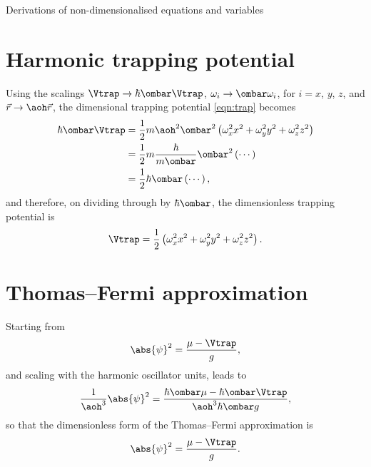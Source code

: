 \begin{chapter}{\label{cha:nondim}Derivations of non-dimensionalised equations
and variables}
  \section{Harmonic trapping potential}
  Using the scalings $\Vtrap \to \hbar \ombar \Vtrap$,  $\omega_{i} \to \ombar
  \omega_{i}$, for $i=x$, $y$, $z$, and $\vec{r} \to \aoh \vec{r}$, the
  dimensional trapping potential \ref{eqn:trap} becomes
  \begin{equation*}
    \begin{aligned}
      \hbar \ombar \Vtrap &= \frac{1}{2} m \aoh^{2} \ombar^{2} \left(
      \omega_{x}^{2} x^{2} + \omega_{y}^{2} y^{2} + \omega_{z}^{2} z^{2}
      \right) \\
      &= \frac{1}{2} m \frac{\hbar}{m \ombar} \ombar^{2} \left( \cdots \right)
      \\
      &= \frac{1}{2} \hbar \ombar \left( \cdots \right),
    \end{aligned}
  \end{equation*}
  and therefore, on dividing through by $\hbar \ombar$, the dimensionless
  trapping potential is
  \begin{equation*}
    \Vtrap = \frac{1}{2} \left( \omega_{x}^{2} x^{2} + \omega_{y}^{2} y^{2} +
    \omega_{z}^{2} z^{2} \right).
  \end{equation*}

  \section{Thomas--Fermi approximation}
  Starting from
  \begin{equation*}
    \abs{\psi}^{2} = \frac{\mu - \Vtrap}{g},
  \end{equation*}
  and scaling with the harmonic oscillator units, leads to
  \begin{equation*}
    \frac{1}{\aoh^{3}} \abs{\psi}^{2} = \frac{\hbar \ombar \mu - \hbar \ombar
    \Vtrap}{\aoh^{3} \hbar \ombar g},
  \end{equation*}
  so that the dimensionless form of the Thomas--Fermi approximation is
  \begin{equation*}
    \abs{\psi}^{2} = \frac{\mu - \Vtrap}{g}.
  \end{equation*}


\end{chapter}

